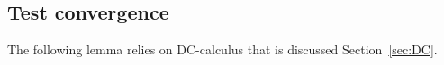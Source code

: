 %
%
%
%
%
%
%
%

\subsection{Test convergence}

The following lemma relies on DC-calculus that is discussed Section~\ref{sec:DC}.

